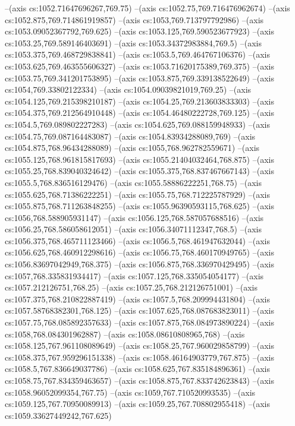 --(axis cs:1052.71647696267,769.75)
--(axis cs:1052.75,769.716476962674)
--(axis cs:1052.875,769.714861919857)
--(axis cs:1053,769.713797792986)
--(axis cs:1053.09052367792,769.625)
--(axis cs:1053.125,769.590523677923)
--(axis cs:1053.25,769.589146403691)
--(axis cs:1053.34372983884,769.5)
--(axis cs:1053.375,769.468729838841)
--(axis cs:1053.5,769.464767106376)
--(axis cs:1053.625,769.463555606327)
--(axis cs:1053.71620175389,769.375)
--(axis cs:1053.75,769.341201753895)
--(axis cs:1053.875,769.339138522649)
--(axis cs:1054,769.33802122334)
--(axis cs:1054.09039821019,769.25)
--(axis cs:1054.125,769.215398210187)
--(axis cs:1054.25,769.213603833303)
--(axis cs:1054.375,769.212564910448)
--(axis cs:1054.46480222728,769.125)
--(axis cs:1054.5,769.089802227283)
--(axis cs:1054.625,769.088159948933)
--(axis cs:1054.75,769.087164483087)
--(axis cs:1054.83934288089,769)
--(axis cs:1054.875,768.96434288089)
--(axis cs:1055,768.962782559671)
--(axis cs:1055.125,768.961815817693)
--(axis cs:1055.21404032464,768.875)
--(axis cs:1055.25,768.839040324642)
--(axis cs:1055.375,768.837467667143)
--(axis cs:1055.5,768.836516129476)
--(axis cs:1055.58886222251,768.75)
--(axis cs:1055.625,768.71386222251)
--(axis cs:1055.75,768.712225787929)
--(axis cs:1055.875,768.711263848255)
--(axis cs:1055.96390593115,768.625)
--(axis cs:1056,768.588905931147)
--(axis cs:1056.125,768.587057688516)
--(axis cs:1056.25,768.586058612051)
--(axis cs:1056.34071112347,768.5)
--(axis cs:1056.375,768.465711123466)
--(axis cs:1056.5,768.461947632044)
--(axis cs:1056.625,768.460912298616)
--(axis cs:1056.75,768.460170949765)
--(axis cs:1056.83697042949,768.375)
--(axis cs:1056.875,768.336970429495)
--(axis cs:1057,768.335831934417)
--(axis cs:1057.125,768.335054054177)
--(axis cs:1057.212126751,768.25)
--(axis cs:1057.25,768.212126751001)
--(axis cs:1057.375,768.210822887419)
--(axis cs:1057.5,768.209994431804)
--(axis cs:1057.58768382301,768.125)
--(axis cs:1057.625,768.087683823011)
--(axis cs:1057.75,768.085892357633)
--(axis cs:1057.875,768.084973890224)
--(axis cs:1058,768.084301962887)
--(axis cs:1058.08610808965,768)
--(axis cs:1058.125,767.961108089649)
--(axis cs:1058.25,767.960029858799)
--(axis cs:1058.375,767.959296151338)
--(axis cs:1058.46164903779,767.875)
--(axis cs:1058.5,767.836649037786)
--(axis cs:1058.625,767.835184896361)
--(axis cs:1058.75,767.834359463657)
--(axis cs:1058.875,767.833742623843)
--(axis cs:1058.96052099354,767.75)
--(axis cs:1059,767.710520993535)
--(axis cs:1059.125,767.70950089913)
--(axis cs:1059.25,767.708802955418)
--(axis cs:1059.33627449242,767.625)
